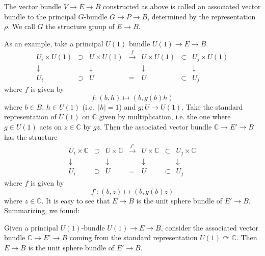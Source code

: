 \documentclass[12pt]{article}
\numberwithin{equation}{section}
\numberwithin{figure}{section}
\theoremstyle{remark}
\def\bC{\mathbb{C}}
\begin{document}
\begin{definition}
  The vector bundle $V\to E\to B$ constructed as above is called 
  an associated vector bundle to the principal $G$-bundle $G\to P\to B$,
  determined by the representation $\rho$.
  We call $G$ the structure group of $E\to B$.
\end{definition}

As an example, take a principal $U(1)$ bundle $U(1)\to E\to B$.
\begin{equation}
  \begin{array}{cccccccc}
    U_i \times U(1) &\supset& U \times U(1) & \xrightarrow{f } & 
    U \times U(1) & \subset & U_j\times U(1) \\
    \downarrow & & \downarrow & & \downarrow & & \downarrow \\
    U_i & \supset & U  & = & U  & \subset & U_j
  \end{array}
\end{equation}
where $f $ is given by \begin{equation}
   f : (b,h) \mapsto (b, g(b)h)
   \label{eq:U1-transition-function}
\end{equation} where $b\in B$, $h\in U(1)$ (i.e.~$|h|=1$) and $g: U\to U(1)$.
Take the standard representation of $U(1)$ on $\bC$ given by multiplication,
i.e. the one where $g\in U(1)$ acts on $z\in \bC$ by $gz$.
Then the associated vector bundle $\bC\to E'\to B$ has the structure 
\begin{equation}
  \begin{array}{cccccccc}
    U_i \times \bC &\supset& U \times \bC & \xrightarrow{f' } & 
    U \times \bC & \subset & U_j\times \bC \\
    \downarrow & & \downarrow & & \downarrow & & \downarrow \\
    U_i & \supset & U  & = & U  & \subset & U_j
  \end{array}
\end{equation}
where $f $ is given by \begin{equation}
   f' : (b,z) \mapsto (b, g(b)z)
   \label{eq:line-bundle-transition-function}
\end{equation} where $z\in \bC$.
It is easy to see that $E\to B$ is the unit sphere bundle of $E'\to B$.
Summarizing, we found:
\begin{proposition}
  Given a principal $U(1)$-bundle $U(1)\to E\to B$,
  consider the associated vector bundle $\bC\to E'\to B$
  coming from the standard representation $U(1)\curvearrowright \bC$.
  Then $E\to B$ is the unit sphere bundle of $E'\to B$.
\end{proposition}
\end{document}
